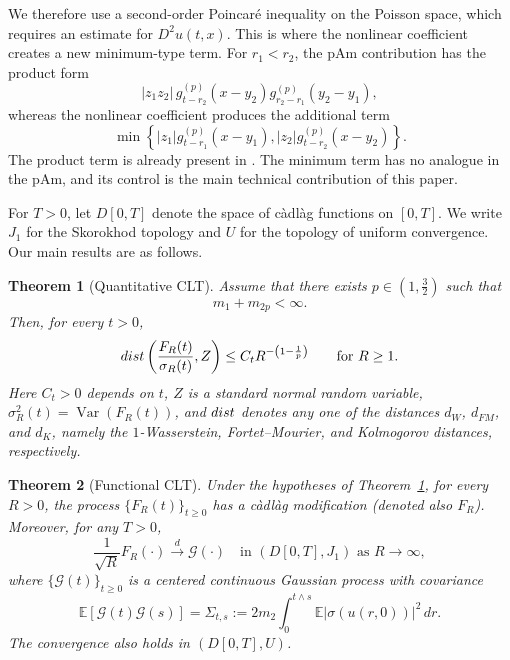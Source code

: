 \documentclass[10pt,a4paper]{amsart}
\newtheorem{theorem}{Theorem}[section]
\def\cG{\mathcal{G}}
\def\bE{\mathbb{E}}
\begin{document}
\medskip



We therefore use a second-order Poincar\'e inequality on the Poisson
space, which requires an estimate for $D^2u(t,x)$. This is where the nonlinear
coefficient creates a new minimum-type term. For $r_1<r_2$, the pAm
contribution has the product form
\[
|z_1z_2|\,
g_{t-r_2}^{(p)}(x-y_2)
g_{r_2-r_1}^{(p)}(y_2-y_1),
\]
whereas the nonlinear coefficient produces the additional term
\begin{equation}
\label{min-term}
\min\left\{
|z_1|g_{t-r_1}^{(p)}(x-y_1),
|z_2|g_{t-r_2}^{(p)}(x-y_2)
\right\}.
\end{equation}
The product term is already present in \cite{BLW26}. The minimum term
has no analogue in the pAm, and its control is the main technical contribution
of this paper.


\medskip

 For $T>0$, let $D[0,T]$ denote the space of c\`adl\`ag functions on
$[0,T]$. We write $J_1$ for the Skorokhod topology and $U$ for the topology of
uniform convergence. Our main results are as follows.


\begin{theorem}[Quantitative CLT]
\label{QCLT}
Assume that there exists $p\in(1,\frac32)$ such that
\begin{equation}
\label{mp-m2p}
m_1+m_{2p}<\infty.
\end{equation}
Then, for every $t>0$,
\[
{\rm dist}\left(\frac{F_R(t)}{\sigma_R(t)},Z\right)
\le C_t R^{-\left(1-\frac1p\right)} \qquad \text{for } R\ge1.
\]
Here $C_t>0$ depends on $t$, $Z$ is a standard normal random variable,
$\sigma_R^2(t)=\operatorname{Var}(F_R(t))$, and ${\rm dist}$ denotes any one
of the distances $d_W$, $d_{FM}$, and $d_K$, namely the $1$-Wasserstein,
Fortet--Mourier, and Kolmogorov distances, respectively.
\end{theorem}

\begin{theorem}[Functional CLT]
\label{FCLT}
Under the hypotheses of Theorem~\ref{QCLT}, for every $R>0$, the process
$\{F_R(t)\}_{t\geq0}$ has a c\`adl\`ag modification (denoted also $F_R$).
Moreover, for any $T>0$,
\[
\frac{1}{\sqrt R}F_R(\cdot)\xrightarrow{d}\cG(\cdot)
\quad \mbox{in $(D[0,T],J_1)$ as $R\to\infty$},
\]
where $\{\cG(t)\}_{t\geq0}$ is a centered continuous Gaussian process with covariance
\[
\bE[\cG(t)\cG(s)]
=\Sigma_{t,s}
:=2m_2\int_0^{t\wedge s}\bE|\sigma(u(r,0))|^2\,dr.
\]
The convergence also holds in $(D[0,T],U)$.
\end{theorem}
\end{document}
